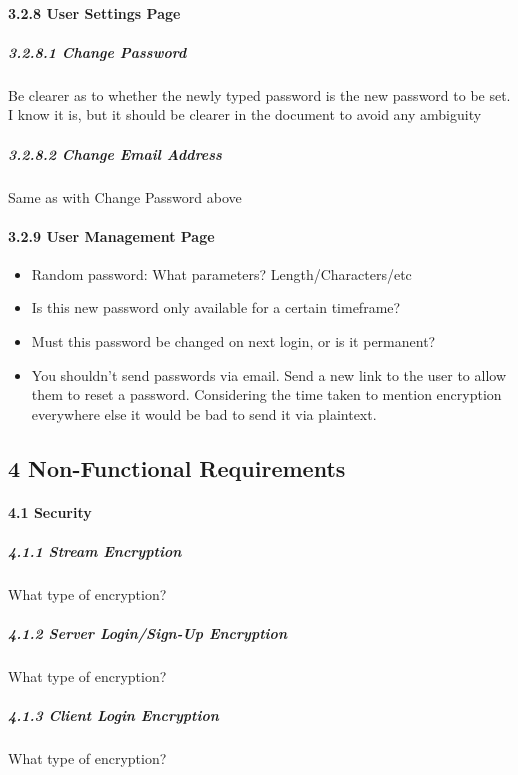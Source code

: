 \documentclass{article}
\begin{document}

\paragraph{3.2.8 User Settings Page}
\subparagraph{3.2.8.1  Change Password}
    Be clearer as to whether the newly typed password is the new password to be
    set.  I know it is, but it should be clearer in the document to avoid any
    ambiguity
\subparagraph{3.2.8.2  Change Email Address}
    Same as with Change Password above


\paragraph{3.2.9  User Management Page}
\begin{itemize}
    \item Random password:  What parameters?  Length/Characters/etc
    \item Is this new password only available for a certain timeframe?
    \item Must this password be changed on next login, or is it permanent?
    \item You shouldn't send passwords via email. Send a new link to the user
        to allow them to reset a password.  Considering the time taken to
        mention encryption everywhere else it would be bad to send it via
        plaintext.
\end{itemize}


\subsection{4 Non-Functional Requirements}

\paragraph{4.1  Security}
\subparagraph{4.1.1  Stream Encryption}
    What type of encryption?
\subparagraph{4.1.2  Server Login/Sign-Up Encryption}
    What type of encryption?
\subparagraph{4.1.3  Client Login Encryption}
    What type of encryption?

\end{document}
